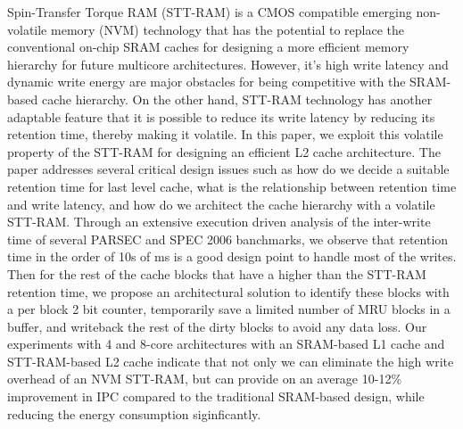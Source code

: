 
Spin-Transfer Torque RAM (STT-RAM) is a CMOS compatible emerging non-volatile memory (NVM) 
technology that has the potential to replace the conventional
on-chip SRAM caches for designing a more efficient memory hierarchy for
future multicore architectures. 
However, it's high write latency and dynamic
write energy are major obstacles for being competitive with the SRAM-based cache hierarchy.
On the other hand, STT-RAM technology has another adaptable feature that it is possible to reduce its write
latency by reducing its retention time, thereby making it volatile.
In this paper, we exploit this volatile property of the STT-RAM for designing an efficient L2 cache 
architecture. The paper addresses several critical design issues such as how do we decide a suitable retention time for last level cache,
what is the relationship between retention time and write latency,
and how do we architect the cache hierarchy with a volatile STT-RAM.
Through an extensive execution driven analysis of the inter-write time  of several PARSEC and SPEC 2006 banchmarks, we 
observe that retention time in the order of 10s of ms is a good design point to handle most of the
writes.  Then for the rest of the cache blocks that have a higher than the STT-RAM retention time, we propose an architectural solution to identify these blocks
with a per block 2 bit counter, temporarily save a limited number of MRU blocks in a buffer,
and writeback the rest of the dirty blocks to avoid any data loss.
Our experiments with 4 and 8-core architectures with an SRAM-based L1 cache and STT-RAM-based L2 cache 
indicate that not only we can eliminate the high write overhead of an NVM STT-RAM, but can provide
on an average 10-12\% improvement in IPC compared to the traditional SRAM-based
design, while reducing the energy consumption siginficantly. 

